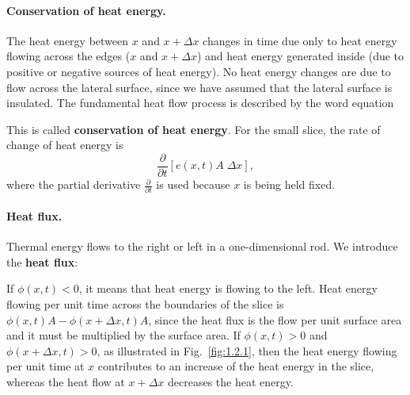 \paragraph{Conservation of heat energy.}
The heat energy between $x$ and $x + \Delta x$ changes in time due only to heat energy flowing across the edges ($x$ and $x + \Delta x$) and heat energy generated inside (due to positive or negative sources of heat energy). No heat energy changes are due to flow across the lateral surface, since we have assumed that the lateral surface is insulated. The fundamental heat flow process is described by the word equation

\begin{center}
\end{center}

This is called \textbf{conservation of heat energy}. For the small slice, the rate of change of heat energy is
\[
\frac{\partial}{\partial t}\left[e(x,t) A\;\Delta x\right],
\]
where the partial derivative $\frac{\partial}{\partial t}$ is used because $x$ is being held fixed.

\paragraph{Heat flux.}
Thermal energy flows to the right or left in a one-dimensional rod. We introduce the \textbf{heat flux}:

\begin{center}
\end{center}

If $\phi(x,t) < 0$, it means that heat energy is flowing to the left. Heat energy flowing per unit time across the boundaries of the slice is $\phi(x,t)A - \phi(x + \Delta x, t)A$, since the heat flux is the flow per unit surface area and it must be multiplied by the surface area. If $\phi(x,t) > 0$ and $\phi(x + \Delta x, t) > 0$, as illustrated in Fig.~\ref{fig:1.2.1}, then the heat energy flowing per unit time at $x$ contributes to an increase of the heat energy in the slice, whereas the heat flow at $x + \Delta x$ decreases the heat energy.

